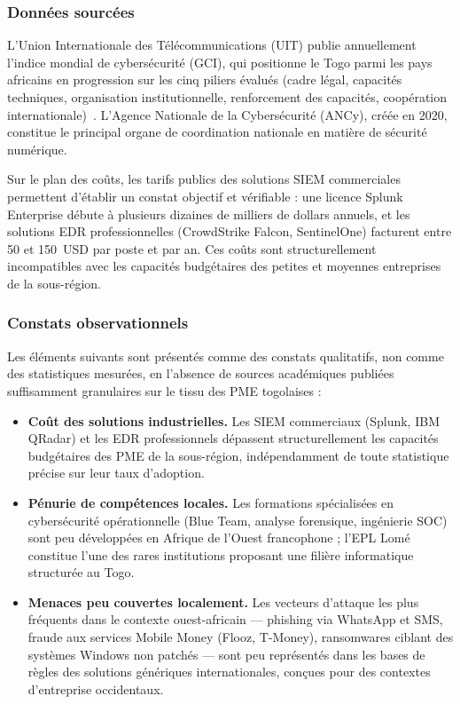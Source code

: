 \documentclass[11pt,a4paper]{article}
\begin{document}
\subsubsection{Données sourcées}

L'Union Internationale des Télécommunications (UIT) publie annuellement
l'indice mondial de cybersécurité (GCI), qui positionne le Togo parmi
les pays africains en progression sur les cinq piliers évalués
(cadre légal, capacités techniques, organisation institutionnelle,
renforcement des capacités, coopération internationale)~\citep{itu_gci2024}.
L'Agence Nationale de la Cybersécurité (ANCy), créée en 2020, constitue
le principal organe de coordination nationale en matière de sécurité numérique.

Sur le plan des coûts, les tarifs publics des solutions SIEM commerciales
permettent d'établir un constat objectif et vérifiable : une licence Splunk
Enterprise débute à plusieurs dizaines de milliers de dollars annuels,
et les solutions EDR professionnelles (CrowdStrike Falcon, SentinelOne)
facturent entre 50 et 150~USD par poste et par an.
Ces coûts sont structurellement incompatibles avec les capacités budgétaires
des petites et moyennes entreprises de la sous-région.

\subsubsection{Constats observationnels}

Les éléments suivants sont présentés comme des constats qualitatifs,
non comme des statistiques mesurées, en l'absence de sources académiques
publiées suffisamment granulaires sur le tissu des PME togolaises :

\begin{itemize}
  \item \textbf{Coût des solutions industrielles.} Les SIEM commerciaux
        (Splunk, IBM QRadar) et les EDR professionnels dépassent
        structurellement les capacités budgétaires des PME de la sous-région,
        indépendamment de toute statistique précise sur leur taux d'adoption.
  \item \textbf{Pénurie de compétences locales.} Les formations spécialisées
        en cybersécurité opérationnelle (Blue Team, analyse forensique,
        ingénierie SOC) sont peu développées en Afrique de l'Ouest
        francophone ; l'EPL Lomé constitue l'une des rares institutions
        proposant une filière informatique structurée au Togo.
  \item \textbf{Menaces peu couvertes localement.} Les vecteurs d'attaque
        les plus fréquents dans le contexte ouest-africain --- phishing via
        WhatsApp et SMS, fraude aux services Mobile Money (Flooz, T-Money),
        ransomwares ciblant des systèmes Windows non patchés --- sont peu
        représentés dans les bases de règles des solutions génériques
        internationales, conçues pour des contextes d'entreprise occidentaux.
\end{itemize}
\end{document}
